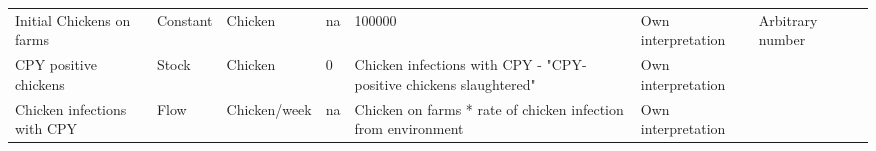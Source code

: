 \begin{landscape}
\begin{longtable}[c]{m{10em}lllm{15em}lll}
Initial Chickens on farms                     & Constant & Chicken                  & na                        & 100000                                                                                                                                                                                                                                                                                   & Own interpretation                                                                                                                                                                           & Arbitrary number                                                                                                                                                                                                                      \\
CPY positive chickens                         & Stock    & Chicken                  & 0                         & Chicken infections with CPY - "CPY-positive chickens slaughtered"                                                                                                                                                                                                                        & Own interpretation                                                                                                                                                                           &                                                                                                                                                                                                                                       \\
Chicken infections with CPY                   & Flow     & Chicken/week             & na                        & Chicken on farms * rate of chicken infection from environment                                                                                                                                                                                                                            & Own interpretation                                                                                                                                                                           &                                                                                                                                                                                                                                       \\

\end{longtable}
\end{landscape}
